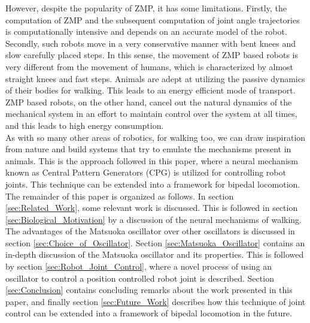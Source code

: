 \documentclass[12pt,twoside]{article}
\theoremstyle{plain}
\theoremstyle{definition}
\theoremstyle{remark}
\newcommand{\forceindent}{\leavevmode{\parindent=2em\indent}}
\begin{document}
\forceindent However, despite the popularity of ZMP, it has some limitations. Firstly, the computation of ZMP and the subsequent computation of joint angle trajectories is computationally intensive and depends on an accurate model of the robot. Secondly, such robots move in a very conservative manner with bent knees and slow carefully placed steps. In this sense, the movement of ZMP based robots is very different from the movement of humans, which is characterized by almost straight knees and fast steps. Animals are adept at utilizing the passive dynamics of their bodies for walking. This leads to an energy efficient mode of transport. ZMP based robots, on the other hand, cancel out the natural dynamics of the mechanical system in an effort to maintain control over the system at all times, and this leads to high energy consumption.\\
\forceindent As with so many other areas of robotics, for walking too, we can draw inspiration from nature and build systems that try to emulate the mechanisms present in animals. This is the approach followed in this paper, where a neural mechanism known as Central Pattern Generators (CPG) is utilized for controlling robot joints. This technique can be extended into a framework for bipedal locomotion. The remainder of this paper is organized as follows. In section \ref{sec:Related_Work}, some relevant work is discussed. This is followed in section \ref{sec:Biological_Motivation} by a discussion of the neural mechanisms of walking. The advantages of the Matsuoka oscillator over other oscillators is discussed in section \ref{sec:Choice_of_Oscillator}.  Section \ref{sec:Matsuoka_Oscillator} contains an in-depth discussion of the Matsuoka oscillator and its properties. This is followed by section \ref{sec:Robot_Joint_Control}, where a novel process of using an oscillator to control a position controlled robot joint is described. Section \ref{sec:Conclusion} contains concluding remarks about the work presented in this paper, and finally section \ref{sec:Future_Work} describes how this technique of joint control can be extended into a framework of bipedal locomotion in the future.
\end{document}
